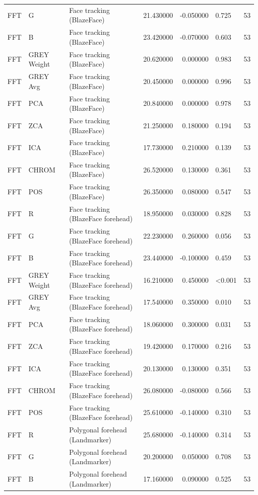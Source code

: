 \begin{table}[htbp]
\begin{tabular}{l l l r r l r}
FFT & G & Face tracking (BlazeFace) & 21.430000 & -0.050000 & 0.725 & 53 \\
FFT & B & Face tracking (BlazeFace) & 23.420000 & -0.070000 & 0.603 & 53 \\
FFT & GREY Weight & Face tracking (BlazeFace) & 20.620000 & 0.000000 & 0.983 & 53 \\
FFT & GREY Avg & Face tracking (BlazeFace) & 20.450000 & 0.000000 & 0.996 & 53 \\
FFT & PCA & Face tracking (BlazeFace) & 20.840000 & 0.000000 & 0.978 & 53 \\
FFT & ZCA & Face tracking (BlazeFace) & 21.250000 & 0.180000 & 0.194 & 53 \\
FFT & ICA & Face tracking (BlazeFace) & 17.730000 & 0.210000 & 0.139 & 53 \\
FFT & CHROM & Face tracking (BlazeFace) & 26.520000 & 0.130000 & 0.361 & 53 \\
FFT & POS & Face tracking (BlazeFace) & 26.350000 & 0.080000 & 0.547 & 53 \\
FFT & R & Face tracking (BlazeFace forehead) & 18.950000 & 0.030000 & 0.828 & 53 \\
FFT & G & Face tracking (BlazeFace forehead) & 22.230000 & 0.260000 & 0.056 & 53 \\
FFT & B & Face tracking (BlazeFace forehead) & 23.440000 & -0.100000 & 0.459 & 53 \\
FFT & GREY Weight & Face tracking (BlazeFace forehead) & 16.210000 & 0.450000 & <0.001 & 53 \\
FFT & GREY Avg & Face tracking (BlazeFace forehead) & 17.540000 & 0.350000 & 0.010 & 53 \\
FFT & PCA & Face tracking (BlazeFace forehead) & 18.060000 & 0.300000 & 0.031 & 53 \\
FFT & ZCA & Face tracking (BlazeFace forehead) & 19.420000 & 0.170000 & 0.216 & 53 \\
FFT & ICA & Face tracking (BlazeFace forehead) & 20.130000 & 0.130000 & 0.351 & 53 \\
FFT & CHROM & Face tracking (BlazeFace forehead) & 26.080000 & -0.080000 & 0.566 & 53 \\
FFT & POS & Face tracking (BlazeFace forehead) & 25.610000 & -0.140000 & 0.310 & 53 \\
FFT & R & Polygonal forehead (Landmarker) & 25.680000 & -0.140000 & 0.314 & 53 \\
FFT & G & Polygonal forehead (Landmarker) & 20.200000 & 0.050000 & 0.708 & 53 \\
FFT & B & Polygonal forehead (Landmarker) & 17.160000 & 0.090000 & 0.525 & 53 \\

\end{tabular}
\end{table}
